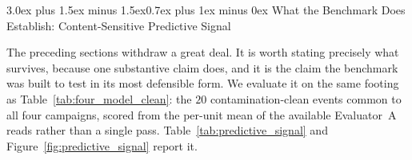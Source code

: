 \documentclass[11pt,journal,onecolumn]{IEEEtran}
\makeatletter
\renewcommand\section{\@startsection{section}{1}{\z@}%
  {3.0ex plus 1.5ex minus 1.5ex}{0.7ex plus 1ex minus 0ex}%
  {\normalfont\normalsize\centering\bfseries}}
\makeatother
\begin{document}
\section{What the Benchmark Does Establish: Content-Sensitive Predictive Signal}
\label{sec:predictive_signal}

The preceding sections withdraw a great deal. It is worth stating precisely what survives, because one substantive claim does, and it is the claim the benchmark was built to test in its most defensible form. We evaluate it on the same footing as Table~\ref{tab:four_model_clean}: the $20$ contamination-clean events common to all four campaigns, scored from the per-unit mean of the available Evaluator~A reads rather than a single pass. Table~\ref{tab:predictive_signal} and Figure~\ref{fig:predictive_signal} report it.
\end{document}
